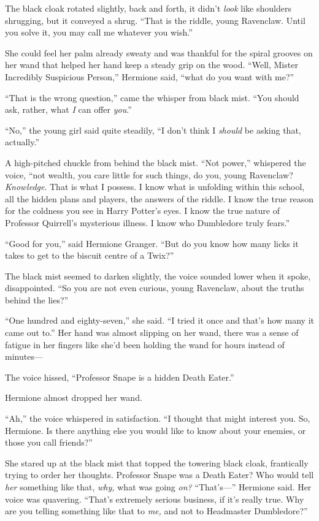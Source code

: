 The black cloak rotated slightly, back and forth, it didn’t \emph{look} like shoulders shrugging, but it conveyed a shrug. “That is the riddle, young Ravenclaw. Until you solve it, you may call me whatever you wish.”

She could feel her palm already sweaty and was thankful for the spiral grooves on her wand that helped her hand keep a steady grip on the wood. “Well, Mister Incredibly Suspicious Person,” Hermione said, “what do you want with me?”

“That is the wrong question,” came the whisper from black mist. “You should ask, rather, what \emph{I} can offer \emph{you}.”

“No,” the young girl said quite steadily, “I don’t think I \emph{should} be asking that, actually.”

A high-pitched chuckle from behind the black mist. “Not power,” whispered the voice, “not wealth, you care little for such things, do you, young Ravenclaw? \emph{Knowledge}. That is what I possess. I know what is unfolding within this school, all the hidden plans and players, the answers of the riddle. I know the true reason for the coldness you see in Harry Potter’s eyes. I know the true nature of Professor Quirrell’s mysterious illness. I know who Dumbledore truly fears.”

“Good for you,” said Hermione Granger. “But do you know how many licks it takes to get to the biscuit centre of a Twix?”

The black mist seemed to darken slightly, the voice sounded lower when it spoke, disappointed. “So you are not even curious, young Ravenclaw, about the truths behind the lies?”

“One hundred and eighty-seven,” she said. “I tried it once and that’s how many it came out to.” Her hand was almost slipping on her wand, there was a sense of fatigue in her fingers like she’d been holding the wand for hours instead of minutes—

The voice hissed, “Professor Snape is a hidden Death Eater.”

Hermione almost dropped her wand.

“Ah,” the voice whispered in satisfaction. “I thought that might interest you. So, Hermione. Is there anything else you would like to know about your enemies, or those you call friends?”

She stared up at the black mist that topped the towering black cloak, frantically trying to order her thoughts. Professor Snape was a Death Eater? Who would tell \emph{her} something like that, \emph{why,} what was going \emph{on?} “That’s—” Hermione said. Her voice was quavering. “That’s extremely serious business, if it’s really true. Why are you telling something like that to \emph{me,} and not to Headmaster Dumbledore?”

